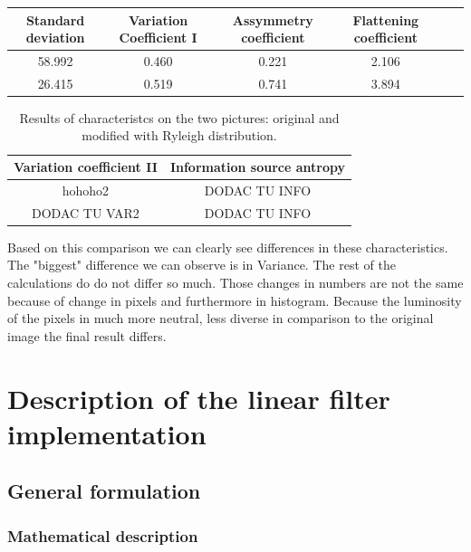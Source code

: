 \documentclass[12pt]{article}
\begin{document}
\begin{table}[H]\centering
    \begin{tabular}{cccccc}

        Standard deviation 	
        &  Variation Coefficient I
        & Assymmetry coefficient
        & Flattening coefficient
        \\\midrule
        58.992                        
        &    0.460  
        &      0.221 
        &		2.106
        \\
         26.415      
       &    0.519
       &    0.741 
       &	 3.894 

       \\

    \end{tabular}
\end{table}
\begin{table}[H]\centering
    \begin{tabular}{cc}


         Variation coefficient II
        & Information source antropy
        \\\midrule
        hohoho2                   
        &DODAC TU INFO
        \\
		DODAC TU VAR2
       	& DODAC TU INFO
       \\

    \end{tabular}
    \caption{Results of characteristcs on the two pictures: original and modified with Ryleigh distribution.}
\end{table}
Based on this  comparison we can clearly see differences in these characteristics. The "biggest" difference we can observe is in Variance. The rest of the calculations do do not differ so much. Those changes in numbers are not the same because of change in pixels and furthermore in histogram. Because the luminosity of the pixels in much more neutral, less diverse in comparison to the original image the final result differs. 
   
\section{Description of the linear filter implementation}

\subsection{General formulation}

\subsubsection{Mathematical description}
\end{document}

